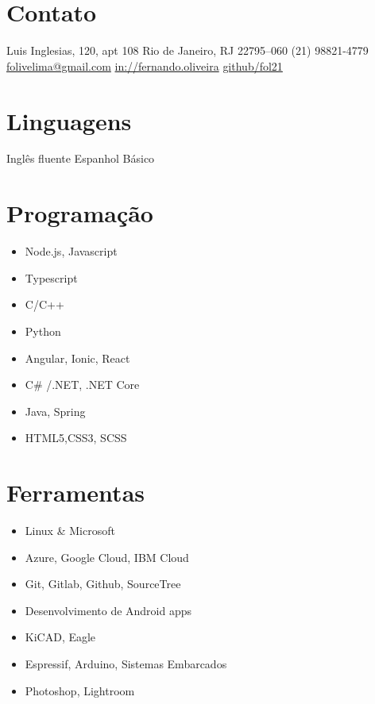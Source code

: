 \documentclass[]{friggeri-cv} %
\begin{document}


\vspace{0.5cm}

 
\begin{aside} %

\section{Contato}
Luis Inglesias, 120, apt 108
Rio de Janeiro, RJ
22795--060
(21) 98821-4779
\href{mailto:folivelima@gmail.com}{folivelima@gmail.com}
\href{https://www.linkedin.com/in/fernando-lima-47673263/}{in://fernando.oliveira}
\href{https://github.com/fol21}{github/fol21}

\section{Linguagens}
Inglês fluente
Espanhol Básico
\section{Programação}
\begin{itemize}
\item Node.js, Javascript
\item Typescript
\item C/C++
\item Python
\item Angular, Ionic, React
\item C\# /.NET, .NET Core
\item Java, Spring
\item HTML5,CSS3, SCSS
\end{itemize}

\section{Ferramentas}
\begin{itemize}
\item Linux \& Microsoft
\item Azure, Google Cloud, IBM Cloud
\item Git, Gitlab, Github, SourceTree
\item Desenvolvimento de Android apps
\item KiCAD, Eagle
\item Espressif, Arduino, Sistemas Embarcados
\item Photoshop, Lightroom
\end{itemize}

\end{aside}
\end{document}
